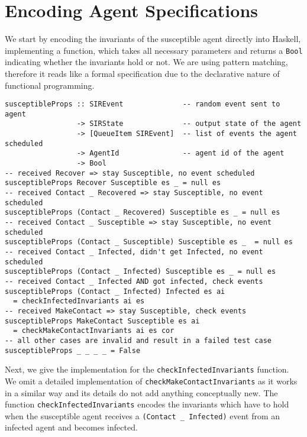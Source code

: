 \section{Encoding Agent Specifications}
\label{sec:method}
We start by encoding the invariants of the susceptible agent directly into Haskell, implementing a function, which takes all necessary parameters and returns a \texttt{Bool} indicating whether the invariants hold or not. We are using pattern matching, therefore it reads like a formal specification due to the declarative nature of functional programming.

\begin{footnotesize}
\begin{verbatim}
susceptibleProps :: SIREvent              -- random event sent to agent
                 -> SIRState              -- output state of the agent
                 -> [QueueItem SIREvent]  -- list of events the agent scheduled
                 -> AgentId               -- agent id of the agent
                 -> Bool
-- received Recover => stay Susceptible, no event scheduled
susceptibleProps Recover Susceptible es _ = null es
-- received Contact _ Recovered => stay Susceptible, no event scheduled
susceptibleProps (Contact _ Recovered) Susceptible es _ = null es
-- received Contact _ Susceptible => stay Susceptible, no event scheduled
susceptibleProps (Contact _ Susceptible) Susceptible es _  = null es
-- received Contact _ Infected, didn't get Infected, no event scheduled
susceptibleProps (Contact _ Infected) Susceptible es _ = null es
-- received Contact _ Infected AND got infected, check events
susceptibleProps (Contact _ Infected) Infected es ai
  = checkInfectedInvariants ai es
-- received MakeContact => stay Susceptible, check events
susceptibleProps MakeContact Susceptible es ai
  = checkMakeContactInvariants ai es cor
-- all other cases are invalid and result in a failed test case
susceptibleProps _ _ _ _ = False
\end{verbatim}
\end{footnotesize}

Next, we give the implementation for the \texttt{checkInfectedInvariants} function. We omit a detailed implementation of \texttt{checkMakeContactInvariants} as it works in a similar way and its details do not add anything conceptually new. The function \texttt{checkInfectedInvariants} encodes the invariants which have to hold when the susceptible agent receives a \texttt{(Contact \_ Infected)} event from an infected agent and becomes infected.

